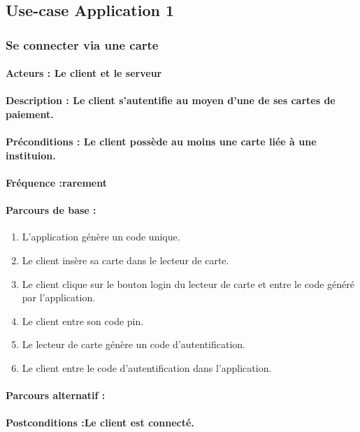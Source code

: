 \documentclass[../annexe.tex]{subfiles}
\begin{document}
\subsection{Use-case Application 1}	

\subsubsection{Se connecter via une carte}
\paragraph{Acteurs : Le client et le serveur}
\paragraph{Description : Le client s'autentifie au moyen d'une de ses cartes de paiement.}
\paragraph{Préconditions : Le client possède au moins une carte liée à une instituion.}
\paragraph{Fréquence :rarement}
\paragraph{Parcours de base :}
\begin{enumerate}
	\item{L'application génère un code unique.}
	\item{Le client insère sa carte dans le lecteur de carte.}
	\item{Le client clique sur le bouton login du lecteur de carte et entre le code généré par l'application.}
	\item{Le client entre son code pin.}
	\item{Le lecteur de carte génère un code d'autentification.}
	\item{Le client entre le code d'autentification dans l'application.}
\end{enumerate}
\paragraph{Parcours alternatif :}
\paragraph{Postconditions :Le client est connecté.}
\end{document}
